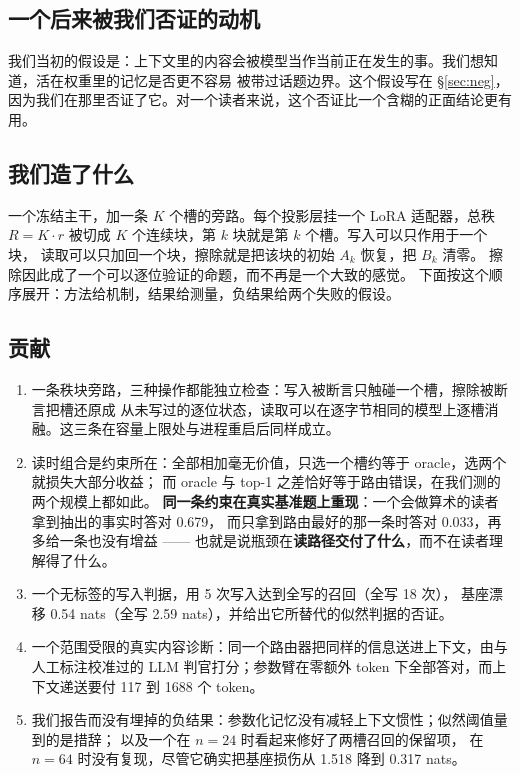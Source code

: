 \documentclass[11pt]{ctexart}
\begin{document}
\subsection{一个后来被我们否证的动机}
我们当初的假设是：上下文里的内容会被模型当作当前正在发生的事。我们想知道，活在权重里的记忆是否更不容易
被带过话题边界。这个假设写在 §\ref{sec:neg}，
因为我们在那里否证了它。对一个读者来说，这个否证比一个含糊的正面结论更有用。

\subsection{我们造了什么}
一个冻结主干，加一条 $K$ 个槽的旁路。每个投影层挂一个 LoRA 适配器，总秩
$R = K \cdot r$ 被切成 $K$ 个连续块，第 $k$ 块就是第 $k$ 个槽。写入可以只作用于一个块，
读取可以只加回一个块，擦除就是把该块的初始 $A_k$ 恢复，把 $B_k$ 清零。
擦除因此成了一个可以逐位验证的命题，而不再是一个大致的感觉。
下面按这个顺序展开：方法给机制，结果给测量，负结果给两个失败的假设。

\subsection{贡献}
\begin{enumerate}\setlength\itemsep{2pt}
\item 一条秩块旁路，三种操作都能独立检查：写入被断言只触碰一个槽，擦除被断言把槽还原成
从未写过的逐位状态，读取可以在逐字节相同的模型上逐槽消融。这三条在容量上限处与进程重启后同样成立。
\item 读时组合是约束所在：全部相加毫无价值，只选一个槽约等于 oracle，选两个就损失大部分收益；
而 oracle 与 top-1 之差恰好等于路由错误，在我们测的两个规模上都如此。
\textbf{同一条约束在真实基准题上重现}：一个会做算术的读者拿到抽出的事实时答对 0.679，
而只拿到路由最好的那一条时答对 0.033，再多给一条也没有增益 ——
也就是说瓶颈在\textbf{读路径交付了什么}，而不在读者理解得了什么。
\item 一个无标签的写入判据，用 5 次写入达到全写的召回（全写 18 次），
基座漂移 0.54 nats（全写 2.59 nats），并给出它所替代的似然判据的否证。
\item 一个范围受限的真实内容诊断：同一个路由器把同样的信息送进上下文，由与人工标注校准过的
LLM 判官打分；参数臂在零额外 token 下全部答对，而上下文递送要付
117 到 1688 个 token。
\item 我们报告而没有埋掉的负结果：参数化记忆没有减轻上下文惯性；似然阈值量到的是措辞；
以及一个在 $n = 24$ 时看起来修好了两槽召回的保留项，
在 $n = 64$ 时没有复现，尽管它确实把基座损伤从
1.518 降到 0.317 nats。
\end{enumerate}
\end{document}
